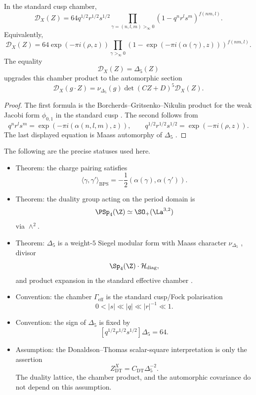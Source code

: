 \begin{proposition}
In the standard cusp chamber,
$$
\mathcal D_X(Z)
=64q^{1/2}r^{1/2}s^{1/2}
\prod_{\gamma=(n,l,m)>_\infty0}
(1-q^nr^ls^m)^{f(nm,l)}.
$$
Equivalently,
$$
\mathcal D_X(Z)
=64\exp(-\pi i(\rho,z))
\prod_{\gamma>_\infty0}
\left(1-\exp(-\pi i(\alpha(\gamma),z))\right)^{f(nm,l)}.
$$
The equality
$$
\mathcal D_X(Z)=\Delta_5(Z)
$$
upgrades this chamber product to the automorphic section
$$
\mathcal D_X(g\cdot Z)
=\nu_{\Delta_5}(g)\det(CZ+D)^5\mathcal D_X(Z).
$$
\end{proposition}

\begin{proof}
The first formula is the Borcherds--Gritsenko--Nikulin product for the
weak Jacobi form $\phi_{0,1}$ in the standard cusp \cite{GN,B}.  The second follows
from
$$
q^nr^ls^m=\exp(-\pi i(\alpha(n,l,m),z)),
\qquad
q^{1/2}r^{1/2}s^{1/2}=\exp(-\pi i(\rho,z)).
$$
The last displayed equation is Maass automorphy of $\Delta_5$
\cite{MAASS:1}.
\end{proof}

\begin{remark}
The following are the precise statuses used here.
\begin{itemize}
\item Theorem: the charge pairing satisfies
$$
\langle\gamma,\gamma'\rangle_{\mathrm{BPS}}
=-\frac12(\alpha(\gamma),\alpha(\gamma')).
$$
\item Theorem: the duality group acting on the period domain is
$$
\PSp_4(\Z)\simeq\SO_+(\La^{3,2})
$$
via $\wedge^2$.
\item Theorem: $\Delta_5$ is a weight-$5$ Siegel modular form with
Maass character $\nu_{\Delta_5}$ \cite{MAASS:1}, divisor
$$
\Sp_4(\Z)\cdot\mathcal H_{\mathrm{diag}},
$$
and product expansion in the standard effective chamber
\cite{GN,B,GC}.
\item Convention: the chamber $\Gamma_{\mathrm{eff}}$ is the standard
cusp/Fock polarisation
$$
0<|s|\ll |q|\ll |r|^{-1}\ll1.
$$
\item Convention: the sign of $\Delta_5$ is fixed by
$$
[q^{1/2}r^{1/2}s^{1/2}]\Delta_5=64.
$$
\item Assumption: the Donaldson--Thomas scalar-square interpretation is
only the assertion
$$
Z^X_{\mathrm{DT}}=C_{\mathrm{DT}}\Delta_5^{-2}.
$$
The duality lattice, the chamber product, and the automorphic covariance
do not depend on this assumption.
\end{itemize}
\end{remark}
